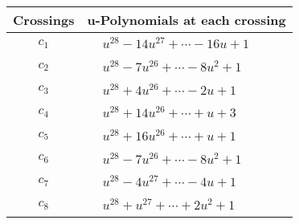 \documentclass[1p]{elsarticle_modified}
\theoremstyle{definition}
\begin{document}
\begin{tabular}{m{50pt}|m{274pt}}
Crossings & \hspace{64pt}u-Polynomials at each crossing \\
\hline $$\begin{aligned}c_{1}\end{aligned}$$&$\begin{aligned}
&u^{28}-14 u^{27}+\cdots-16 u+1
\end{aligned}$\\
\hline $$\begin{aligned}c_{2}\end{aligned}$$&$\begin{aligned}
&u^{28}-7 u^{26}+\cdots-8 u^2+1
\end{aligned}$\\
\hline $$\begin{aligned}c_{3}\end{aligned}$$&$\begin{aligned}
&u^{28}+4 u^{26}+\cdots-2 u+1
\end{aligned}$\\
\hline $$\begin{aligned}c_{4}\end{aligned}$$&$\begin{aligned}
&u^{28}+14 u^{26}+\cdots+u+3
\end{aligned}$\\
\hline $$\begin{aligned}c_{5}\end{aligned}$$&$\begin{aligned}
&u^{28}+16 u^{26}+\cdots+u+1
\end{aligned}$\\
\hline $$\begin{aligned}c_{6}\end{aligned}$$&$\begin{aligned}
&u^{28}-7 u^{26}+\cdots-8 u^2+1
\end{aligned}$\\
\hline $$\begin{aligned}c_{7}\end{aligned}$$&$\begin{aligned}
&u^{28}-4 u^{27}+\cdots-4 u+1
\end{aligned}$\\
\hline $$\begin{aligned}c_{8}\end{aligned}$$&$\begin{aligned}
&u^{28}+u^{27}+\cdots+2 u^2+1
\end{aligned}$\\

\end{tabular}
\end{document}
